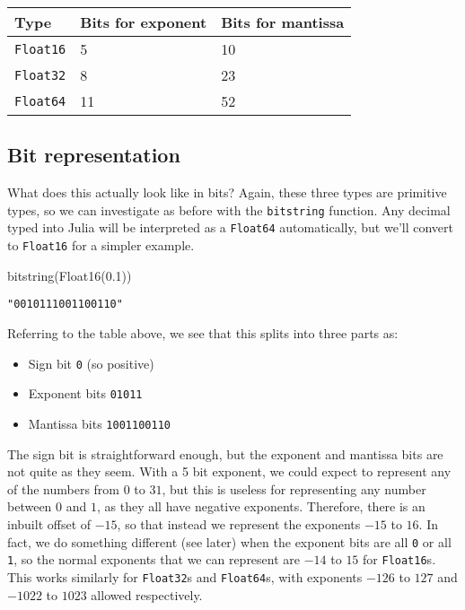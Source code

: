 \documentclass[
  letterpaper,
  DIV=11,
  numbers=noendperiod]{scrreprt}
\newenvironment{Shaded}{\begin{snugshade}}{\end{snugshade}}
\newcommand{\FloatTok}[1]{\textcolor[rgb]{0.68,0.00,0.00}{#1}}
\newcommand{\FunctionTok}[1]{\textcolor[rgb]{0.28,0.35,0.67}{#1}}
\newcommand{\NormalTok}[1]{\textcolor[rgb]{0.00,0.23,0.31}{#1}}
\begin{document}
\begin{longtable}[]{@{}lll@{}}
\toprule\noalign{}
Type & Bits for exponent & Bits for mantissa \\
\midrule\noalign{}
\endhead
\bottomrule\noalign{}
\endlastfoot
\texttt{Float16} & 5 & 10 \\
\texttt{Float32} & 8 & 23 \\
\texttt{Float64} & 11 & 52 \\
\end{longtable}

\hypertarget{bit-representation}{%
\subsection{Bit representation}\label{bit-representation}}

What does this actually look like in bits? Again, these three types are
primitive types, so we can investigate as before with the
\texttt{bitstring} function. Any decimal typed into Julia will be
interpreted as a \texttt{Float64} automatically, but we'll convert to
\texttt{Float16} for a simpler example.

\begin{Shaded}
\begin{Highlighting}[]
\FunctionTok{bitstring}\NormalTok{(}\FunctionTok{Float16}\NormalTok{(}\FloatTok{0.1}\NormalTok{))}
\end{Highlighting}
\end{Shaded}

\begin{verbatim}
"0010111001100110"
\end{verbatim}

Referring to the table above, we see that this splits into three parts
as:

\begin{itemize}
\item
  Sign bit \texttt{0} (so positive)
\item
  Exponent bits \texttt{01011}
\item
  Mantissa bits \texttt{1001100110}
\end{itemize}

The sign bit is straightforward enough, but the exponent and mantissa
bits are not quite as they seem. With a 5 bit exponent, we could expect
to represent any of the numbers from \(0\) to \(31\), but this is
useless for representing any number between \(0\) and \(1\), as they all
have negative exponents. Therefore, there is an inbuilt offset of
\(-15\), so that instead we represent the exponents \(-15\) to \(16\).
In fact, we do something different (see later) when the exponent bits
are all \texttt{0} or all \texttt{1}, so the normal exponents that we
can represent are \(-14\) to \(15\) for \texttt{Float16}s. This works
similarly for \texttt{Float32}s and \texttt{Float64}s, with exponents
\(-126\) to \(127\) and \(-1022\) to \(1023\) allowed respectively.
\end{document}
